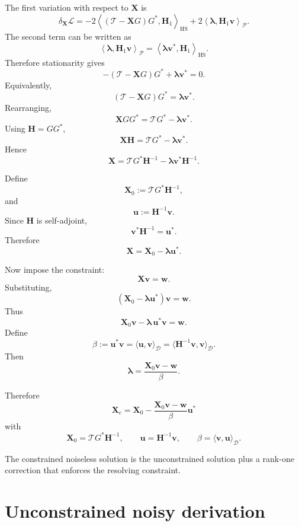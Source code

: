 \documentclass[11pt,openany]{book}
\theoremstyle{definition}
\theoremstyle{remark}
\newcommand{\D}{\mathcal D}
\newcommand{\Pspace}{\mathcal P}
\newcommand{\Tau}{\mathcal{T}}
\newcommand{\HS}{\mathrm{HS}}
\begin{document}
The first variation with respect to \(\mathbf X\) is
\[
  \delta_{\mathbf X}\mathcal L
  =
  -2
  \left\langle
    (\Tau-\mathbf XG)G^*,
    \mathbf H_1
  \right\rangle_{\HS}
  +
  2
  \left\langle
    \boldsymbol\lambda,
    \mathbf H_1\mathbf v
  \right\rangle_{\Pspace}.
\]
The second term can be written as
\[
  \left\langle
    \boldsymbol\lambda,
    \mathbf H_1\mathbf v
  \right\rangle_{\Pspace}
  =
  \left\langle
    \boldsymbol\lambda\mathbf v^*,
    \mathbf H_1
  \right\rangle_{\HS}.
\]
Therefore stationarity gives
\[
  -(\Tau-\mathbf XG)G^*
  +
  \boldsymbol\lambda\mathbf v^*
  =
  0.
\]
Equivalently,
\[
  (\Tau-\mathbf XG)G^*
  =
  \boldsymbol\lambda\mathbf v^*.
\]
Rearranging,
\[
  \mathbf XGG^*
  =
  \Tau G^*-\boldsymbol\lambda\mathbf v^*.
\]
Using \(\mathbf H=GG^*\),
\[
  \mathbf X\mathbf H
  =
  \Tau G^*-\boldsymbol\lambda\mathbf v^*.
\]
Hence
\[
  \mathbf X
  =
  \Tau G^*\mathbf H^{-1}
  -
  \boldsymbol\lambda\mathbf v^*\mathbf H^{-1}.
\]

Define
\[
  \mathbf X_0:=\Tau G^*\mathbf H^{-1},
\]
and
\[
  \mathbf u:=\mathbf H^{-1}\mathbf v.
\]
Since \(\mathbf H\) is self-adjoint,
\[
  \mathbf v^*\mathbf H^{-1}=\mathbf u^*.
\]
Therefore
\[
  \mathbf X
  =
  \mathbf X_0-\boldsymbol\lambda\mathbf u^*.
\]

Now impose the constraint:
\[
  \mathbf X\mathbf v=\mathbf w.
\]
Substituting,
\[
  (\mathbf X_0-\boldsymbol\lambda\mathbf u^*)\mathbf v
  =
  \mathbf w.
\]
Thus
\[
  \mathbf X_0\mathbf v
  -
  \boldsymbol\lambda\,\mathbf u^*\mathbf v
  =
  \mathbf w.
\]
Define
\[
  \beta
  :=
  \mathbf u^*\mathbf v
  =
  \langle \mathbf u,\mathbf v\rangle_{\D}
  =
  \langle \mathbf H^{-1}\mathbf v,\mathbf v\rangle_{\D}.
\]
Then
\[
  \boldsymbol\lambda
  =
  \frac{\mathbf X_0\mathbf v-\mathbf w}{\beta}.
\]

Therefore
\[
  \boxed{
  \mathbf X_c
  =
  \mathbf X_0
  -
  \frac{\mathbf X_0\mathbf v-\mathbf w}{\beta}
  \mathbf u^*
  }
\]
with
\[
  \mathbf X_0=\Tau G^*\mathbf H^{-1},
  \qquad
  \mathbf u=\mathbf H^{-1}\mathbf v,
  \qquad
  \beta=\langle \mathbf v,\mathbf u\rangle_{\D}.
\]

\begin{lessonbox}
The constrained noiseless solution is the unconstrained solution plus a rank-one correction that
enforces the resolving constraint.
\end{lessonbox}

\section{Unconstrained noisy derivation}
\end{document}

